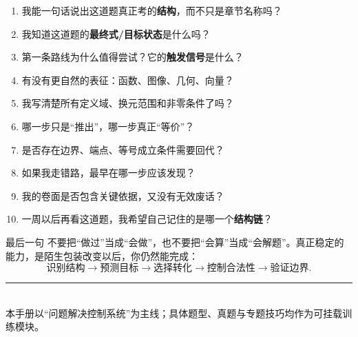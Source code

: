 \documentclass[11pt,a4paper]{ctexart}
\begin{document}
\begin{enumerate}
  \item 我能一句话说出这道题真正考的\textbf{结构}，而不只是章节名称吗？
  \item 我知道这道题的\textbf{最终式/目标状态}是什么吗？
  \item 第一条路线为什么值得尝试？它的\textbf{触发信号}是什么？
  \item 有没有更自然的表征：函数、图像、几何、向量？
  \item 我写清楚所有定义域、换元范围和非零条件了吗？
  \item 哪一步只是“推出”，哪一步真正“等价”？
  \item 是否存在边界、端点、等号成立条件需要回代？
  \item 如果我走错路，最早在哪一步应该发现？
  \item 我的卷面是否包含关键依据，又没有无效废话？
  \item 一周以后再看这道题，我希望自己记住的是哪一个\textbf{结构链}？
\end{enumerate}

\begin{trainingbox}{最后一句}
不要把“做过”当成“会做”，也不要把“会算”当成“会解题”。真正稳定的能力，是陌生包装改变以后，你仍然能完成：
\[
\boxed{\text{识别结构}\rightarrow\text{预测目标}\rightarrow\text{选择转化}\rightarrow\text{控制合法性}\rightarrow\text{验证边界}}.
\]
\end{trainingbox}

\vfill
\begin{center}
\rule{0.7\textwidth}{0.5pt}\\[0.5em]
\small 本手册以“问题解决控制系统”为主线；具体题型、真题与专题技巧均作为可挂载训练模块。\par
\end{center}
\end{document}
